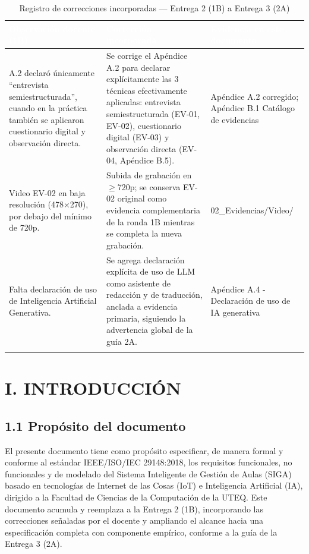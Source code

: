 \begingroup
\small
\begin{longtable}{|p{5.2cm}|p{5.2cm}|p{5.2cm}|}
\hline
\cellcolor{sigagreen}\textcolor{white}{\textbf{Observación docente (1B)}} & \cellcolor{sigagreen}\textcolor{white}{\textbf{Corrección incorporada}} & \cellcolor{sigagreen}\textcolor{white}{\textbf{Evidencia en este documento}} \\ \hline
A.2 declaró únicamente ``entrevista semiestructurada'', cuando en la práctica también se aplicaron cuestionario digital y observación directa. & Se corrige el Apéndice A.2 para declarar explícitamente las 3 técnicas efectivamente aplicadas: entrevista semiestructurada (EV-01, EV-02), cuestionario digital (EV-03) y observación directa (EV-04, Apéndice B.5). & Apéndice A.2 corregido; Apéndice B.1 Catálogo de evidencias \\ \hline
Video EV-02 en baja resolución (478$\times$270), por debajo del mínimo de 720p. & Subida de grabación en $\geq$720p; se conserva EV-02 original como evidencia complementaria de la ronda 1B mientras se completa la nueva grabación. & 02\_Evidencias/Video/ \\ \hline
Falta declaración de uso de Inteligencia Artificial Generativa. & Se agrega declaración explícita de uso de LLM como asistente de redacción y de traducción, anclada a evidencia primaria, siguiendo la advertencia global de la guía 2A. & Apéndice A.4 - Declaración de uso de IA generativa \\ \hline
\caption{Registro de correcciones incorporadas --- Entrega 2 (1B) a Entrega 3 (2A)}
\end{longtable}
\endgroup

\section*{I. INTRODUCCIÓN}


\subsection*{1.1 Propósito del documento}


El presente documento tiene como propósito especificar, de manera formal y conforme al estándar IEEE/ISO/IEC 29148:2018, los requisitos funcionales, no funcionales y de modelado del Sistema Inteligente de Gestión de Aulas (SIGA) basado en tecnologías de Internet de las Cosas (IoT) e Inteligencia Artificial (IA), dirigido a la Facultad de Ciencias de la Computación de la UTEQ. Este documento acumula y reemplaza a la Entrega 2 (1B), incorporando las correcciones señaladas por el docente y ampliando el alcance hacia una especificación completa con componente empírico, conforme a la guía de la Entrega 3 (2A).


